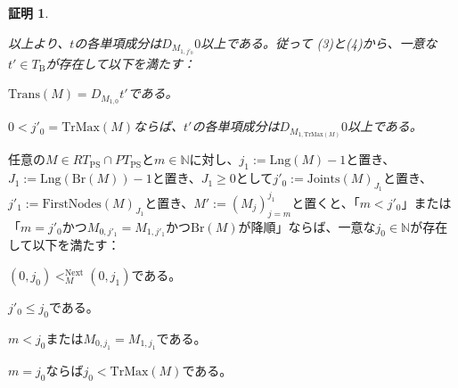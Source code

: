 \documentclass[dvipdfmx,uplatex]{jsarticle}
\theoremstyle{customnonumberbreakfortheorem}
\theoremstyle{customnonumberbreakforproof}
\newtheorem{hideableproof}{証明}
\begin{document}
\begin{hideableproof}
\begin{indented}
\begin{indented}
\begin{penumerate}
				\item[] 以上より、\(t\)の各単項成分は\(D_{M_{1,j'_0}} 0\)以上である。従って (3)と(4)から、一意な\(t' \in T_{\textrm{B}}\)が存在して以下を満たす：
				\begin{penumerate}
					\item \(\textrm{Trans}(M) = D_{M_{1,0}} t'\)である。
					\setcounter{penumerateii}{3}
					\item \(0 < j'_0 = \textrm{TrMax}(M)\)ならば、\(t'\)の各単項成分は\(D_{M_{1,\textrm{TrMax}(M)}} 0\)以上である。
				\end{penumerate}
			\end{penumerate}
		\end{indented}
	\end{indented}
\end{hideableproof}

\begin{lemma}[条件(V)の下での右端の親の基本性質]\label{条件(V)の下での右端の親の基本性質}
	任意の\(M \in RT_{\textrm{PS}} \cap PT_{\textrm{PS}}\)と\(m \in \mathbb{N}\)に対し、\(j_1 := \textrm{Lng}(M)-1\)と置き、\(J_1 := \textrm{Lng}(\textrm{Br}(M))-1\)と置き、\(J_1 \geq 0\)として\(j'_0 := \textrm{Joints}(M)_{J_1}\)と置き、\(j'_1 := \textrm{FirstNodes}(M)_{J_1}\)と置き、\(M' := (M_j)_{j=m}^{j_1}\)と置くと、「\(m < j'_0\)」または「\(m = j'_0\)かつ\(M_{0,j'_1} = M_{1,j'_1}\)かつ\(\textrm{Br}(M)\)が降順」ならば、一意な\(j_0 \in \mathbb{N}\)が存在して以下を満たす：
	\begin{penumerate}
		\item \((0,j_0) <_M^{\textrm{Next}} (0,j_1)\)である。
		\item \(j'_0 \leq j_0\)である。
		\item \(m < j_0\)または\(M_{0,j_1} = M_{1,j_1}\)である。
		\item \(m = j_0\)ならば\(j_0 < \textrm{TrMax}(M)\)である。
	\end{penumerate}
\end{lemma}
\end{document}
